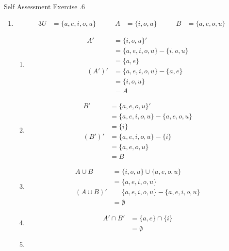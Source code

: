 \documentclass[../notes.tex]{subfiles}
\begin{document}
\begin{exercise}{Self Assessment Exercise \thechapter.6}
\begin{enumerate}
          \item \moveup
            \begin{alignat*}{3}
              U &= \{a, e, i, o, u\} \qquad & A &= \{i, o, u\} \qquad & B &= \{a, e, o, u\}
            \end{alignat*}
            \begin{enumerate}[label=(\alph*)]
              \item \moveup
                \begin{align*}
                  A' &= \{i, o, u\}'\\
                  &= \{a, e, i, o, u\} - \{i, o, u\}\\
                  &= \{a, e\}\\
                  \left(A'\right)' &= \{a, e, i, o, u\} - \{a, e\}\\
                  &= \{i, o, u\}\\
                  &= A
                \end{align*}
              \item \moveup
                \begin{align*}
                  B' &= \{a, e, o, u\}'\\
                  &= \{a, e, i, o, u\} - \{a, e, o, u\}\\
                  &= \{i\}\\
                  \left(B'\right)' &= \{a, e, i, o, u\} - \{i\}\\
                  &= \{a, e, o, u\}\\
                  &= B
                \end{align*}
              \item \moveup
                \begin{align*}
                  A \cup B &= \{i, o, u\} \cup \{a, e, o, u\}\\
                  &= \{a, e, i, o, u\}\\
                  (A \cup B)' &= \{a, e, i, o, u\} - \{a, e, i, o, u\}\\
                  &= \emptyset
                \end{align*}
              \item \moveup
                \begin{align*}
                  A' \cap B' &= \{a, e\} \cap \{i\}\\
                  &= \emptyset
                \end{align*}
              \item \moveup

\end{enumerate}
\end{enumerate}
\end{exercise}
\end{document}
